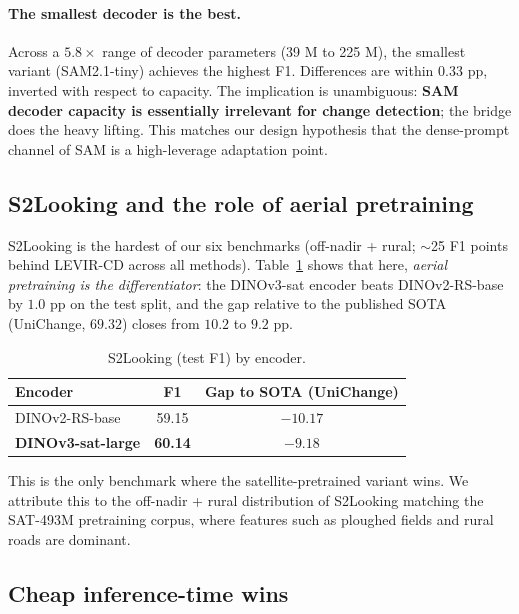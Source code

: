 \paragraph{The smallest decoder is the best.} Across a $5.8\times$ range
of decoder parameters (39 M to 225 M), the smallest variant
(SAM2.1-tiny) achieves the highest F1. Differences are within $0.33$ pp,
inverted with respect to capacity. The implication is unambiguous:
\textbf{SAM decoder capacity is essentially irrelevant for change
detection}; the bridge does the heavy lifting. This matches our design
hypothesis that the dense-prompt channel of SAM is a high-leverage
adaptation point.

\subsection{S2Looking and the role of aerial pretraining}
\label{sec:s2looking-detail}

S2Looking is the hardest of our six benchmarks (off-nadir + rural; $\sim$25 F1
points behind LEVIR-CD across all methods). Table~\ref{tab:s2looking}
shows that here, \emph{aerial pretraining is the differentiator}: the
DINOv3-sat encoder beats DINOv2-RS-base by $1.0$ pp on the test split, and
the gap relative to the published SOTA (UniChange, $69.32$) closes from
$10.2$ to $9.2$ pp.

\begin{table}[h]
  \centering
  \small
  \caption{S2Looking (test F1) by encoder.}
  \label{tab:s2looking}
  \begin{tabular}{lcc}
    \toprule
    Encoder & F1 & Gap to SOTA (UniChange) \\
    \midrule
    DINOv2-RS-base   & 59.15 & $-10.17$ \\
    \textbf{DINOv3-sat-large} & \textbf{60.14} & $-9.18$ \\
    \bottomrule
  \end{tabular}
\end{table}

This is the only benchmark where the satellite-pretrained variant wins.
We attribute this to the off-nadir + rural distribution of S2Looking
matching the SAT-493M pretraining corpus, where features such as ploughed
fields and rural roads are dominant.

\subsection{Cheap inference-time wins}
\label{sec:cheap-wins}

